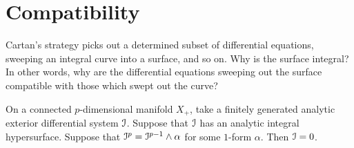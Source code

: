 \section{Compatibility}
Cartan's strategy picks out a determined subset of differential equations,
sweeping an integral curve into a surface, and so on.
Why is the surface integral?
In other words, why are the differential equations sweeping out the surface compatible with those which swept out the curve?
\begin{lemma}\label{lemma:domino}
On a connected \(p\)-dimensional manifold \(X_+\), take a finitely generated analytic exterior differential system \(\mathcal{I}\).
Suppose that \(\mathcal{I}\) has an analytic integral hypersurface.
Suppose that \(\mathcal{I}^p=\mathcal{I}^{p-1}\wedge\alpha\) for some \(1\)-form \(\alpha\).
Then \(\mathcal{I}=0\).
\end{lemma}

